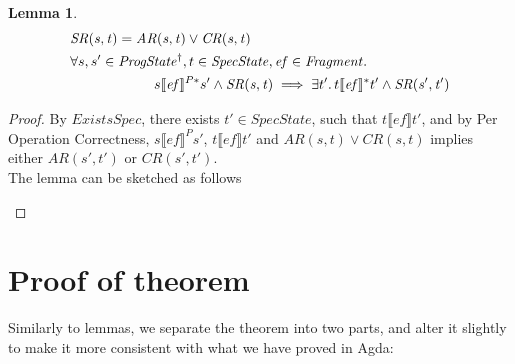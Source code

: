 \documentclass[a4paper,11pt]{article}
\newtheorem{lemma}[theorem]{Lemma}
\theoremstyle{definition}
\begin{document}
\begin{lemma}\label{lemma-1}
	\begin{align*}
		&\mathit{SR(s, t)} = \mathit{AR(s, t)} \lor \mathit{CR(s, t)}\\
		&\forall s, s' \in \mathit{ProgState^\dagger}, t \in \mathit{SpecState}, \mathit{ef} \in \mathit{Fragment} \ldotp\\
		&\qquad \qquad \qquad s \llbracket \mathit{ef} \rrbracket^{P*} s'  \land \mathit{SR(s, t)} \implies \exists t' \ldotp t\llbracket \mathit{ef} \rrbracket^* t' \land \mathit{SR(s', t')} \\
	\end{align*}
\end{lemma}
\begin{proof}
	By $\mathit{ExistsSpec}$, there exists $t' \in SpecState$, such that $t \llbracket \mathit{ef} \rrbracket t'$, and by Per Operation Correctness, $s \llbracket \mathit{ef} \rrbracket^P s'$, $t \llbracket \mathit{ef} \rrbracket t'$ and $\mathit{AR(s, t)} \lor \mathit{CR(s, t)}$ implies either $\mathit{AR(s', t')}$ or $\mathit{CR(s', t')}$. \\
	The lemma can be sketched as follows
	\begin{figure} [h] \centering
{}
	\end{figure}
\end{proof}

\section{Proof of theorem}

Similarly to lemmas, we separate the theorem into two parts, and alter it slightly to make it more consistent with what we have proved in Agda:
\end{document}
